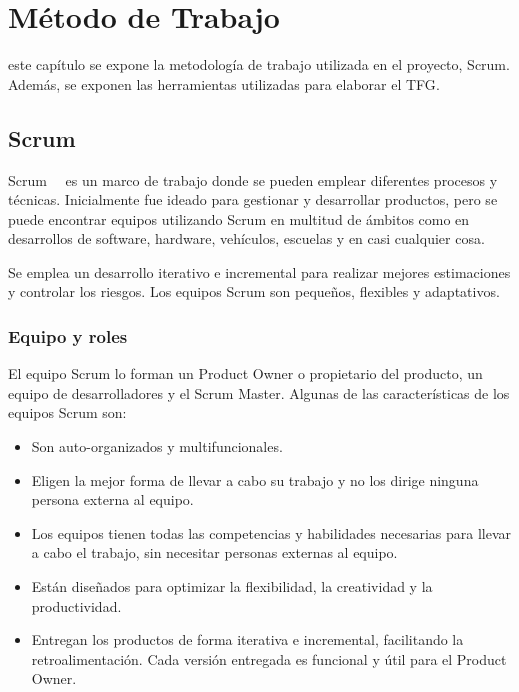 \chapter{Método de Trabajo}
\label{chap:metodo}

 este capítulo se expone la metodología de trabajo utilizada en el proyecto, Scrum. Además,
se exponen las herramientas utilizadas para elaborar el \acs{TFG}.

\section{Scrum}

Scrum~\cite{SCRUM}~\cite{SCRUMXP} es un marco de trabajo donde se pueden emplear diferentes procesos y técnicas. Inicialmente 
fue ideado para gestionar y desarrollar productos, pero se puede encontrar equipos utilizando Scrum 
en multitud de ámbitos como en desarrollos de software, hardware, vehículos, escuelas y en casi cualquier 
cosa.

Se emplea un desarrollo iterativo e incremental para realizar mejores estimaciones y controlar 
los riesgos. Los equipos Scrum son pequeños, flexibles y adaptativos. 

\subsection{Equipo y roles}

El equipo Scrum lo forman un Product Owner o propietario del producto, un equipo de desarrolladores y el Scrum Master. Algunas
de las características de los equipos Scrum son:

\begin{itemize}
	\item Son auto-organizados y multifuncionales.
	\item Eligen la mejor forma de llevar a cabo su trabajo y no los dirige ninguna persona externa al equipo.
	\item Los equipos tienen todas las competencias y habilidades necesarias para llevar a cabo el trabajo,
	sin necesitar personas externas al equipo.
	\item Están diseñados para optimizar la flexibilidad, la creatividad y la productividad.
	\item Entregan los productos de forma iterativa e incremental, facilitando la retroalimentación. Cada versión entregada
	es funcional y útil para el Product Owner.
\end{itemize}

